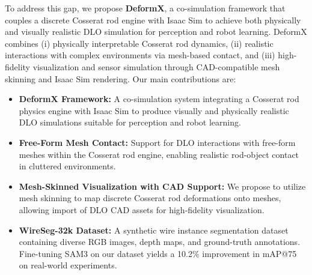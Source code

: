 \documentclass[letterpaper, 10 pt, conference]{ieeeconf}  %
\begin{document}
To address this gap, we propose \textbf{DeformX}, a co-simulation framework that couples a discrete Cosserat rod engine with Isaac Sim to achieve both physically and visually realistic DLO simulation for perception and robot learning. DeformX combines (i) physically interpretable Cosserat rod dynamics, (ii) realistic interactions with complex environments via mesh-based contact, and (iii) high-fidelity visualization and sensor simulation through CAD-compatible mesh skinning and Isaac Sim rendering. Our main contributions are:

\begin{itemize}
    \item \textbf{DeformX Framework:} A co-simulation system integrating a Cosserat rod physics engine with Isaac Sim to produce visually and physically realistic DLO simulations suitable for perception and robot learning.
    \item \textbf{Free-Form Mesh Contact:} Support for DLO interactions with free-form meshes within the Cosserat rod engine, enabling realistic rod-object contact in cluttered environments.
    \item \textbf{Mesh-Skinned Visualization with CAD Support:} We propose to utilize mesh skinning to map discrete Cosserat rod deformations onto meshes, allowing import of DLO CAD assets for high-fidelity visualization.
    \item \textbf{WireSeg-32k Dataset:} A synthetic wire instance segmentation dataset containing diverse RGB images, depth maps, and ground-truth annotations. Fine-tuning SAM3 on our dataset yields a 10.2\% improvement in mAP@75 on real-world experiments.
\end{itemize}



\end{document}
